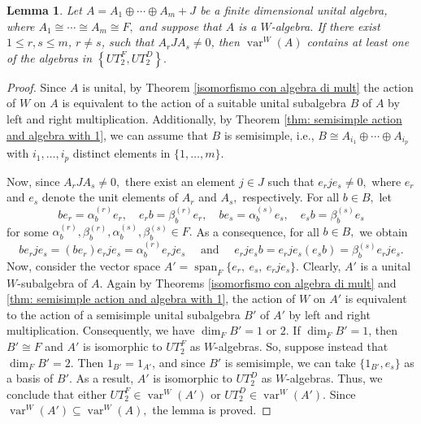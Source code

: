 \documentclass[reqno]{amsart}
\newtheorem{lemma}[theorem]{Lemma}
\theoremstyle{definition}
\numberwithin{equation}{section}
\numberwithin{theorem}{section}
\DeclareMathOperator{\spa}{span}
\DeclareMathOperator{\V}{var}
\begin{document}
\begin{lemma}\label{lem: AiJAk in J^q}
Let $A=A_1\oplus \cdots \oplus A_m + J$ be a finite dimensional unital algebra, where $A_1 \cong \cdots \cong  A_m \cong F,$ and suppose that $A$ is a $W$-algebra. 
If there exist $1\leq r,s\leq  m$, $r \neq s$, such that $A_r JA_s\neq 0$, then  $\V^W(A)$ contains at least one of the algebras in $\left\{UT_2^F, UT_2^D\right\}.$ 
\end{lemma}
\begin{proof}
    Since $A$ is unital, by Theorem \ref{isomorfismo con algebra di mult} the action of $W$ on $A$ is equivalent to the action of a suitable unital subalgebra $B$ of $A$ by left and right multiplication. Additionally, by Theorem \ref{thm: semisimple action and algebra with 1}, we can assume that $B$ is semisimple, i.e., $B\cong A_{i_1}\oplus \cdots \oplus A_{i_p}$ with $i_1, \ldots, i_p$ distinct elements in $\{1,\ldots, m\}.$ 

    Now, since $A_rJA_s\neq 0,$ there exist an element $j\in J$ such that $e_rje_s\neq 0,$ where $e_r$ and $e_s$ denote the unit elements of $A_r$ and $A_s,$ respectively. 
    For all $b\in B,$ let
    $$
     be_r=\alpha_b^{(r)} e_r, \quad e_rb=\beta_b^{(r)} e_r, \quad be_s=\alpha_b^{(s)} e_s, \quad 
     e_s b=\beta_b^{(s)} e_s
    $$
    for some $\alpha_b^{(r)},\beta_b^{(r)}, \alpha_b^{(s)} , \beta_b^{(s)}\in F.$ As a consequence, for all $b\in B,$ we obtain
    $$
    be_rj e_s=(be_r)e_rj e_s=\alpha_b^{(r)} e_rj e_s \quad \text{ and } \quad  e_rj e_s b=e_rj e_s(e_s b)=\beta_b^{(s)} e_rj e_s.
    $$
    Now, consider the vector space
    $A'=\spa_F\{e_r, \ e_s, \ e_r j e_s \}.$ 
    Clearly, $A'$ is a unital $W$-subalgebra of $A.$ Again by Theorems \ref{isomorfismo con algebra di mult} and \ref{thm: semisimple action and algebra with 1}, the action of $W$ on $A'$ is equivalent to the action of a semisimple unital subalgebra $B'$ of $A'$ by left and right multiplication. Consequently, we have $\dim_F B'=1 $ or $2.$
If $\dim_F B'=1 $, then $B'\cong F$ and $A'$ is isomorphic to $ UT_2^F$ as $W$-algebras. So, suppose instead that $\dim_F B'=2 .$ Then $1_{B'}=1_{A'}$, and since $B'$ is semisimple, we can take $\{1_{B'}, e_s\}$ as a basis of $B'.$ As a result, $A'$ is isomorphic to $UT_2^D$ as $W$-algebras. Thus, we conclude that either $UT_2^F\in \V^W(A')$ or $UT_2^D\in \V^W(A').$ Since $\V^W(A')\subseteq\V^W(A),$ the lemma is proved.
\end{proof}
\end{document}
